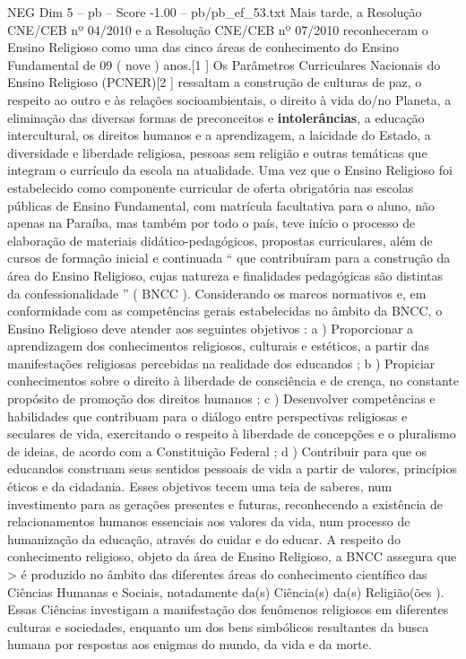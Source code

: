 \begin{textsample}{NEG Dim 5 – pb – Score -1.00 – pb/pb\_ef\_53.txt}
Mais tarde, a Resolução CNE/CEB nº 04/2010 e a Resolução CNE/CEB nº 07/2010 reconheceram o Ensino Religioso como uma das cinco áreas de conhecimento do Ensino Fundamental de 09 ( nove ) anos.[1 ] Os Parâmetros Curriculares Nacionais do Ensino Religioso (PCNER)[2 ] ressaltam a construção de culturas de paz, o respeito ao outro e às relações socioambientais, o direito à vida do/no Planeta, a eliminação das diversas formas de preconceitos e \textbf{intolerâncias}, a educação intercultural, os direitos humanos e a aprendizagem, a laicidade do Estado, a diversidade e liberdade religiosa, pessoas sem religião e outras temáticas que integram o currículo da escola na atualidade.
Uma vez que o Ensino Religioso foi estabelecido como componente curricular de oferta obrigatória nas escolas públicas de Ensino Fundamental, com matrícula facultativa para o aluno, não apenas na Paraíba, mas também por todo o país, teve início o processo de elaboração de materiais didático-pedagógicos, propostas curriculares, além de cursos de formação inicial e continuada “ que contribuíram para a construção da área do Ensino Religioso, cujas natureza e finalidades pedagógicas são distintas da confessionalidade ” ( BNCC ).
Considerando os marcos normativos e, em conformidade com as competências gerais estabelecidas no âmbito da BNCC, o Ensino Religioso deve atender aos seguintes objetivos : a ) Proporcionar a aprendizagem dos conhecimentos religiosos, culturais e estéticos, a partir das manifestações religiosas percebidas na realidade dos educandos ; b ) Propiciar conhecimentos sobre o direito à liberdade de consciência e de crença, no constante propósito de promoção dos direitos humanos ; c ) Desenvolver competências e habilidades que contribuam para o diálogo entre perspectivas religiosas e seculares de vida, exercitando o respeito à liberdade de concepções e o pluralismo de ideias, de acordo com a Constituição Federal ; d ) Contribuir para que os educandos construam seus sentidos pessoais de vida a partir de valores, princípios éticos e da cidadania.
Esses objetivos tecem uma teia de saberes, num investimento para as gerações presentes e futuras, reconhecendo a existência de relacionamentos humanos essenciais aos valores da vida, num processo de humanização da educação, através do cuidar e do educar.
A respeito do conhecimento religioso, objeto da área de Ensino Religioso, a BNCC assegura que > é produzido no âmbito das diferentes áreas do conhecimento científico das Ciências Humanas e Sociais, notadamente da(s) Ciência(s) da(s) Religião(ões ).
Essas Ciências investigam a manifestação dos fenômenos religiosos em diferentes culturas e sociedades, enquanto um dos bens simbólicos resultantes da busca humana por respostas aos enigmas do mundo, da vida e da morte.

\end{textsample}
